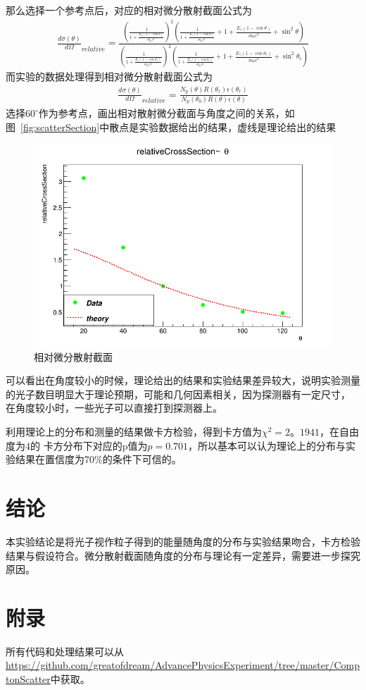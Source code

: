 \documentclass[10pt]{ctexart}
\begin{document}
那么选择一个参考点后，对应的相对微分散射截面公式为
\begin{align}
    \frac{d\sigma(\theta)}{d\Omega}_{relative}=\frac{(\frac{1}{1+\frac{E_\gamma(1-\cos{\theta})}{m_0c^2}})^2(\frac{1}{1+\frac{E_\gamma(1-\cos{\theta})}{m_0c^2}}+1+\frac{E_\gamma(1-\cos{\theta})}{m_0c^2}+\sin^2{\theta})}{(\frac{1}{1+\frac{E_\gamma(1-\cos{\theta_r})}{m_0c^2}})^2(\frac{1}{1+\frac{E_\gamma(1-\cos{\theta_r})}{m_0c^2}}+1+\frac{E_\gamma(1-\cos{\theta_r})}{m_0c^2}+\sin^2{\theta_r})}
    \label{equ:scatterSectionRelative}
\end{align}
而实验的数据处理得到相对微分散射截面公式为
\begin{align}
    \frac{d\sigma(\theta)}{d\Omega}_{relative}=\frac{N_p(\theta)R(\theta_r)\epsilon(\theta_r)}{N_p(\theta_0)R(\theta)\epsilon(\theta)}
    \label{equ:scatterSectionRelativeExp}
\end{align}
选择$60^\circ$作为参考点，画出相对散射微分截面与角度之间的关系，如图~\ref{fig:scatterSection}中散点是实验数据给出的结果，虚线是理论给出的结果
\begin{figure}[htbp]
    \centering
    \includegraphics[width=\textwidth]{data/scatterPBarn.png}
    \caption{相对微分散射截面}
    \label{fig:fit}
\end{figure}
可以看出在角度较小的时候，理论给出的结果和实验结果差异较大，说明实验测量的光子数目明显大于理论预期，可能和几何因素相关，因为探测器有一定尺寸，
在角度较小时，一些光子可以直接打到探测器上。

利用理论上的分布和测量的结果做卡方检验，得到卡方值为$\chi^2=2。1941$，在自由度为4的
卡方分布下对应的p值为$p=0.701$，所以基本可以认为理论上的分布与实验结果在置信度为70\%的条件下可信的。

\section{结论}
本实验结论是将光子视作粒子得到的能量随角度的分布与实验结果吻合，卡方检验结果与假设符合。微分散射截面随角度的分布与理论有一定差异，需要进一步探究原因。
\section{附录}
所有代码和处理结果可以从\url{https://github.com/greatofdream/AdvancePhysicsExperiment/tree/master/ComptonScatter}中获取。

\end{document}
